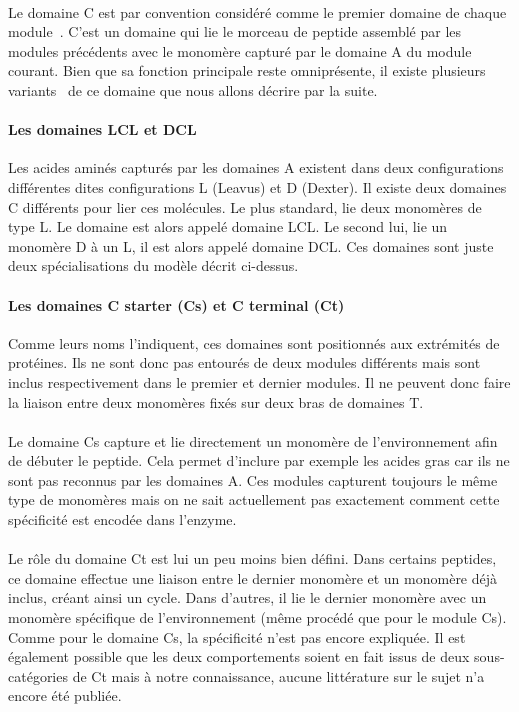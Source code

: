 \documentclass[12pt,french,twoside]{report}
\begin{document}
\paragraph{}Le domaine C est par convention considéré comme le premier domaine de chaque module~\cite{stachelhaus_peptide_1998}.
C'est un domaine qui lie le morceau de peptide assemblé par les modules précédents avec le monomère capturé par le domaine A du module courant.
Bien que sa fonction principale reste omniprésente, il existe plusieurs variants~\cite{rausch_phylogenetic_2007} de ce domaine que nous allons décrire par la suite.

\paragraph{Les domaines LCL et DCL}
Les acides aminés capturés par les domaines A existent dans deux configurations différentes dites configurations L (Leavus) et D (Dexter).
Il existe deux domaines C différents pour lier ces molécules.
Le plus standard, lie deux monomères de type L. Le domaine est alors appelé domaine LCL.
Le second lui, lie un monomère D à un L, il est alors appelé domaine DCL.
Ces domaines sont juste deux spécialisations du modèle décrit ci-dessus.

\paragraph{Les domaines C starter (Cs) et C terminal (Ct)}
Comme leurs noms l'indiquent, ces domaines sont positionnés aux extrémités de protéines.
Ils ne sont donc pas entourés de deux modules différents mais sont inclus respectivement dans le premier et dernier modules.
Il ne peuvent donc faire la liaison entre deux monomères fixés sur deux bras de domaines T.

\paragraph{}Le domaine Cs capture et lie directement un monomère de l'environnement afin de débuter le peptide.
Cela permet d'inclure par exemple les acides gras car ils ne sont pas reconnus par les domaines A.
Ces modules capturent toujours le même type de monomères mais on ne sait actuellement pas exactement comment cette spécificité est encodée dans l'enzyme.

\paragraph{}Le rôle du domaine Ct est lui un peu moins bien défini.
Dans certains peptides, ce domaine effectue une liaison entre le dernier monomère et un monomère déjà inclus, créant ainsi un cycle\cite{gao_cyclization_2012}.
Dans d'autres, il lie le dernier monomère avec un monomère spécifique de l'environnement (même procédé que pour le module Cs).
Comme pour le domaine Cs, la spécificité n'est pas encore expliquée.
Il est également possible que les deux comportements soient en fait issus de deux sous-catégories de Ct mais à notre connaissance, aucune littérature sur le sujet n'a encore été publiée.
\end{document}
